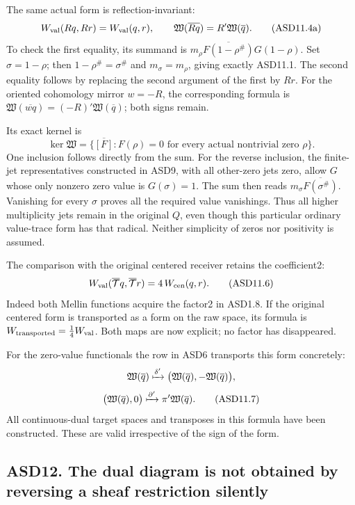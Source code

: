 The same actual form is reflection-invariant: \[
 W_{\rm val}(Rq,Rr)=W_{\rm val}(q,r),\qquad
 \mathfrak W(\overline{Rq})=R'\mathfrak W(\overline q).
 \tag{ASD11.4a}
\] To check the first equality, its summand is
\(m_\rho\overline{F(1-\rho^\#)}G(1-\rho)\). Set \(\sigma=1-\rho\); then
\(1-\rho^\#=\sigma^\#\) and \(m_\sigma=m_\rho\), giving exactly ASD11.1.
The second equality follows by replacing the second argument of the
first by \(Rr\). For the oriented cohomology mirror \(w=-R\), the
corresponding formula is
\(\mathfrak W(\overline{wq})=(-R)'\mathfrak W(\overline q)\); both signs
remain.

Its exact kernel is \[
 \ker\mathfrak W
 =\{\overline{[F]}:F(\rho)=0
       \text{ for every actual nontrivial zero }\rho\}.
 \tag{ASD11.5}
\] One inclusion follows directly from the sum. For the reverse
inclusion, the finite-jet representatives constructed in ASD9, with all
other-zero jets zero, allow \(G\) whose only nonzero zero value is
\(G(\sigma)=1\). The sum then reads \(m_\sigma\overline{F(\sigma^\#)}\).
Vanishing for every \(\sigma\) proves all the required value vanishings.
Thus all higher multiplicity jets remain in the original \(Q\), even
though this particular ordinary value-trace form has that radical.
Neither simplicity of zeros nor positivity is assumed.

The comparison with the original centered receiver retains the
coefficient2: \[
 W_{\rm val}(\overline{\mathcal T}q,
             \overline{\mathcal T}r)
 =4\,W_{\rm cen}(q,r).
 \tag{ASD11.6}
\] Indeed both Mellin functions acquire the factor2 in ASD1.8. If the
original centered form is transported as a form on the raw space, its
formula is \(W_{\rm transported}=\tfrac14W_{\rm val}\). Both maps are
now explicit; no factor has disappeared.

For the zero-value functionals the row in ASD6 transports this form
concretely: \[
 \mathfrak W(\overline q)
 \xmapsto{\delta'}
 \bigl(\mathfrak W(\overline q),-\mathfrak W(\overline q)\bigr),
\] \[
 \bigl(\mathfrak W(\overline q),0\bigr)
 \xmapsto{\partial'}\pi'\mathfrak W(\overline q).
 \tag{ASD11.7}
\] All continuous-dual target spaces and transposes in this formula have
been constructed. These are valid irrespective of the sign of the form.

\subsection{ASD12. The dual diagram is not obtained by reversing a sheaf
restriction
silently}\label{asd12.-the-dual-diagram-is-not-obtained-by-reversing-a-sheaf-restriction-silently}

